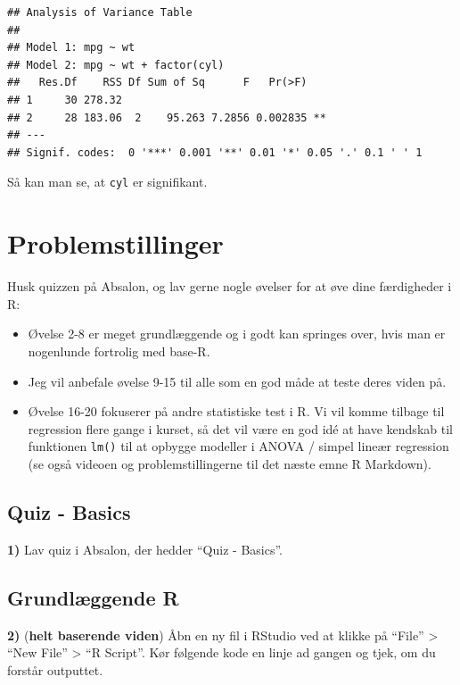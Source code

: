 \documentclass[
]{book}
\providecommand{\tightlist}{%
  \setlength{\itemsep}{0pt}\setlength{\parskip}{0pt}}
\theoremstyle{definition}
\theoremstyle{definition}
\theoremstyle{definition}
\theoremstyle{definition}
\theoremstyle{remark}
\begin{document}
\begin{verbatim}
## Analysis of Variance Table
## 
## Model 1: mpg ~ wt
## Model 2: mpg ~ wt + factor(cyl)
##   Res.Df    RSS Df Sum of Sq      F   Pr(>F)   
## 1     30 278.32                                
## 2     28 183.06  2    95.263 7.2856 0.002835 **
## ---
## Signif. codes:  0 '***' 0.001 '**' 0.01 '*' 0.05 '.' 0.1 ' ' 1
\end{verbatim}

Så kan man se, at \texttt{cyl} er signifikant.

\section{Problemstillinger}\label{problemstillinger}

Husk quizzen på Absalon, og lav gerne nogle øvelser for at øve dine færdigheder i R:

\begin{itemize}
\tightlist
\item
  Øvelse 2-8 er meget grundlæggende og i godt kan springes over, hvis man er nogenlunde fortrolig med base-R.
\item
  Jeg vil anbefale øvelse 9-15 til alle som en god måde at teste deres viden på.
\item
  Øvelse 16-20 fokuserer på andre statistiske test i R. Vi vil komme tilbage til regression flere gange i kurset, så det vil være en god idé at have kendskab til funktionen \texttt{lm()} til at opbygge modeller i ANOVA / simpel lineær regression (se også videoen og problemstillingerne til det næste emne R Markdown).
\end{itemize}

\subsection{Quiz - Basics}\label{quiz---basics}

\textbf{1)} Lav quiz i Absalon, der hedder ``Quiz - Basics''.

\subsection{Grundlæggende R}\label{grundluxe6ggende-r}

\textbf{2)} (\textbf{helt baserende viden}) Åbn en ny fil i RStudio ved at klikke på ``File'' \textgreater{} ``New File'' \textgreater{} ``R Script''. Kør følgende kode en linje ad gangen og tjek, om du forstår outputtet.
\end{document}
